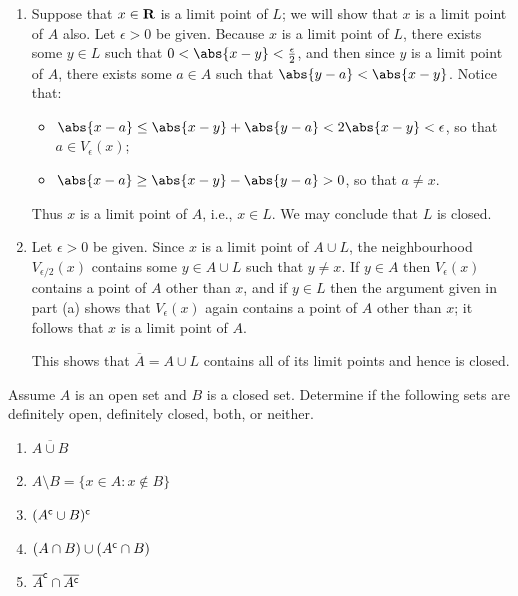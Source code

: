 \documentclass{lew98_solutions}
\begin{document}
\begin{solution}
    \begin{enumerate}
        \item Suppose that \( x \in \mathbf{R} \) is a limit point of \( L \); we will show that \( x \) is a limit point of \( A \) also. Let \( \epsilon > 0 \) be given. Because \( x \) is a limit point of \( L \), there exists some \( y \in L \) such that \( 0 < \abs{x - y} < \tfrac{\epsilon}{2} \), and then since \( y \) is a limit point of \( A \), there exists some \( a \in A \) such that \( \abs{y - a} < \abs{x - y} \). Notice that:
        \begin{itemize}
            \item \( \abs{x - a} \leq \abs{x - y} + \abs{y - a} < 2 \abs{x - y} < \epsilon \), so that \( a \in V_{\epsilon}(x) \);

            \item \( \abs{x - a} \geq \abs{x - y} - \abs{y - a} > 0 \), so that \( a \neq x \).
        \end{itemize}
        Thus \( x \) is a limit point of \( A \), i.e., \( x \in L \). We may conclude that \( L \) is closed.

        \item Let \( \epsilon > 0 \) be given. Since \( x \) is a limit point of \( A \cup L \), the neighbourhood \( V_{\epsilon/2}(x) \) contains some \( y \in A \cup L \) such that \( y \neq x \). If \( y \in A \) then \( V_{\epsilon}(x) \) contains a point of \( A \) other than \( x \), and if \( y \in L \) then the argument given in part (a) shows that \( V_{\epsilon}(x) \) again contains a point of \( A \) other than \( x \); it follows that \( x \) is a limit point of \( A \).

        This shows that \( \overline{A} = A \cup L \) contains all of its limit points and hence is closed.
    \end{enumerate}
\end{solution}

\begin{exercise}
\label{ex:3.2.8}
    Assume \( A \) is an open set and \( B \) is a closed set. Determine if the following sets are definitely open, definitely closed, both, or neither.
    \begin{enumerate}
        \item \( \overline{A \cup B} \)

        \item \( A \setminus B = \{ x \in A : x \not\in B \} \)

        \item \( (A^{\mathsf{c}} \cup B)^{\mathsf{c}} \)

        \item \( (A \cap B) \cup (A^{\mathsf{c}} \cap B) \)

        \item \( \overline{A}^{\mathsf{c}} \cap \overline{A^{\mathsf{c}}} \)
    \end{enumerate}
\end{exercise}
\end{document}
